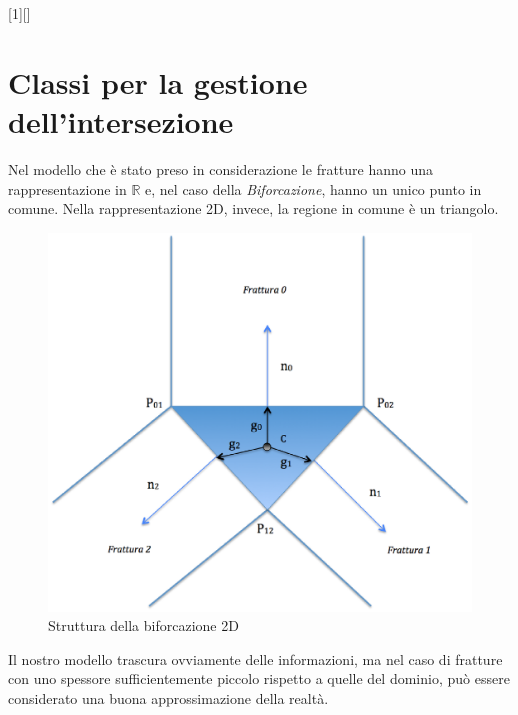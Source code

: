 [1][]{}{}

\chapter{Classi per la gestione dell'intersezione}

Nel modello che è stato preso in considerazione le fratture hanno una rappresentazione in $\mathbb{R}$ e, nel caso della \textit{Biforcazione}, hanno un unico punto in comune. 
Nella rappresentazione 2D, invece, la regione in comune è un triangolo. \\

\begin{figure}[htbp]
\centering
\includegraphics[scale=.5]{img/subcap3_3/TriangoloBiforcazione.eps}
\caption{Struttura della biforcazione 2D}\label{Biforcazione}
\end{figure}

Il nostro modello trascura ovviamente delle informazioni, ma nel caso di fratture con uno spessore sufficientemente piccolo rispetto a quelle del dominio, può essere considerato una buona approssimazione della realtà.\\

